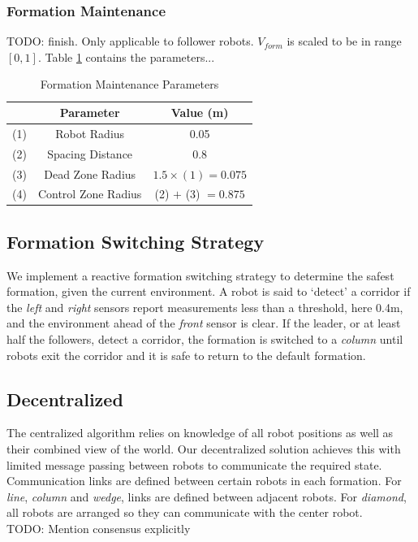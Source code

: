 \documentclass[letterpaper, 10 pt, conference]{ieeeconf}  %
\begin{document}
	\subsubsection*{Formation Maintenance}
	TODO: finish.
	Only applicable to follower robots.
	$V_{form}$ is scaled to be in range $[0,1]$. Table \ref{table_formation} contains the parameters...
	
	\begin{table}[h]
		\begin{center}
			\begin{tabular}{|c|c|c|}
				\hline
				& Parameter & Value (m) \\
				\hline
				(1) & Robot Radius               & 0.05 \\
				(2) & Spacing Distance            & 0.8 \\
				(3) & Dead Zone Radius          & $1.5 \times (1) = 0.075$ \\
				(4) & Control Zone Radius        & (2) $+$ (3) $=0.875$\\
				\hline
			\end{tabular}
		\end{center}
		\caption{Formation Maintenance Parameters}
		\label{table_formation}
	\end{table}
	
	\subsection{Formation Switching Strategy}
	We implement a reactive formation switching strategy to determine the safest formation, given the current environment. A robot is said to `detect' a corridor if the \textit{left} and \textit{right} sensors report measurements less than a threshold, here 0.4m, and the environment ahead of the \textit{front} sensor is clear. 
	If the leader, or at least half the followers, detect a corridor, the formation is switched to a \textit{column} until robots exit the corridor and it is safe to return to the default formation.
	
	\subsection{Decentralized}
	
	The centralized algorithm relies on knowledge of all robot positions as well as their combined view of the world. Our decentralized solution achieves this with limited message passing between robots to communicate the required state. Communication links are defined between certain robots in each formation. For \textit{line}, \textit{column} and \textit{wedge}, links are defined between adjacent robots. For \textit{diamond}, all robots are arranged so they can communicate with the center robot.  
	\\TODO: Mention consensus explicitly \\
	
\end{document}
